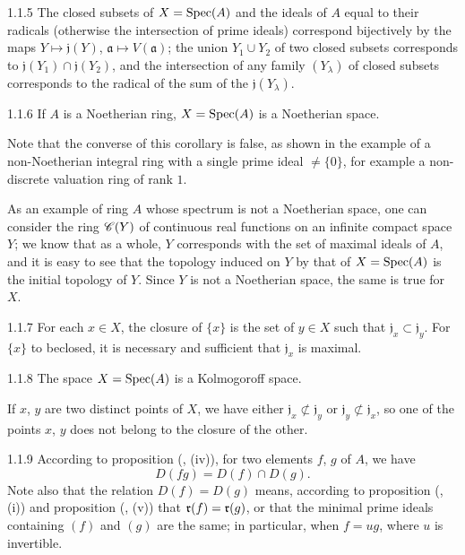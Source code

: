 \documentclass[10pt,oneside]{book}
\begin{document}
\begin{envs}[Corollary]{1.1.5}
\label{cor-1.1.1.5}
The closed subsets of $X={\mathop{\mathrm{Spec}}\nolimits}(A)$ and the ideals of $A$ equal to their radicals (otherwise the
intersection of prime ideals) correspond bijectively by the  maps $Y\mapsto\mathfrak{j}(Y)$,
$\mathfrak{a}\mapsto V(\mathfrak{a})$; the union $Y_1\cup Y_2$ of two closed subsets corresponds to
$\mathfrak{j}(Y_1)\cap\mathfrak{j}(Y_2)$, and the intersection of any family $(Y_\lambda)$ of closed subsets
corresponds to the radical of the sum of the $\mathfrak{j}(Y_\lambda)$.
\end{envs}

\begin{envs}[Corollary]{1.1.6}
\label{cor-1.1.1.6}
If $A$ is a Noetherian ring, $X={\mathop{\mathrm{Spec}}\nolimits}(A)$ is a Noetherian space.
\end{envs}
Note that the converse of this corollary is false, as shown
in the example of a non-Noetherian integral ring with a single prime ideal $\neq\{0\}$, for
example a non-discrete valuation ring of rank $1$.

As an example of ring $A$ whose spectrum is not a Noetherian space, one
can consider the ring $\mathscr{C}(Y)$ of continuous real functions on an infinite compact space
$Y$; we know that as a whole, $Y$ corresponds with the set of maximal ideals
of $A$, and it is easy to see that the topology induced on $Y$ by that of $X={\mathop{\mathrm{Spec}}\nolimits}(A)$
is the initial topology of $Y$. Since $Y$ is not a Noetherian space, the same is true for $X$.

\begin{envs}[Corollary]{1.1.7}
\label{cor-1.1.1.7}
For each $x\in X$, the closure of $\{x\}$ is the set of $y\in X$ such that $\mathfrak{j}_x\subset\mathfrak{j}_y$.
For $\{x\}$ to beclosed, it is necessary and sufficient that $\mathfrak{j}_x$ is maximal.
\end{envs}

\begin{envs}[Corollary]{1.1.8}
\label{cor-1.1.1.8}
The space $X={\mathop{\mathrm{Spec}}\nolimits}(A)$ is a Kolmogoroff space.
\end{envs}

If $x$, $y$ are two distinct points of $X$, we have either $\mathfrak{j}_x\not\subset\mathfrak{j}_y$ or
$\mathfrak{j}_y\not\subset\mathfrak{j}_x$, so one of the points $x$, $y$ does not belong to the closure of the other.

\begin{env}{1.1.9}
\label{env-1.1.1.9}
According to proposition (, (iv)), for two elements $f$, $g$ of $A$, we have
\[
  D(fg)=D(f)\cap D(g).\tag{1.1.9.1}
\]
Note also that the relation $D(f)=D(g)$ means, according to proposition (, (i))
and proposition (, (v)) that $\mathfrak{r}(f)=\mathfrak{r}(g)$, or that the minimal prime
ideals containing $(f)$ and $(g)$ are the same; in particular, when $f=ug$, where $u$ is
invertible.
\end{env}
\end{document}
